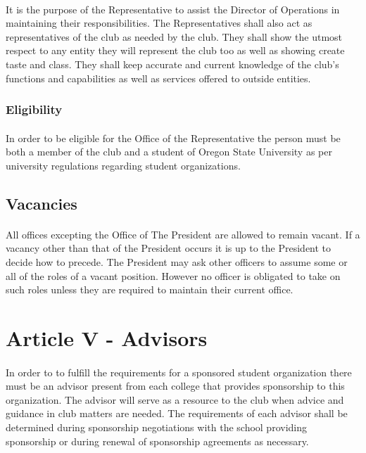 \documentclass[12pt]{article}
\newcommand{\article}[1]{
\setcounter{section}{0}
\setcounter{subsection}{0}

	\section*{#1}
	\addcontentsline{toc}{section}{#1}
	
}
\begin{document}
\paragraph{}
It is the purpose of the Representative to assist the Director of Operations in maintaining their responsibilities. The Representatives shall also act as representatives of the club as needed by the club. They shall show
the utmost respect to any entity they will represent the club too as well as showing create taste and class. They shall keep accurate and current knowledge of the club's functions and capabilities as well
as services offered to outside entities.
\subsubsection{Eligibility}
\paragraph{}
In order to be eligible for the Office of the Representative the person must be both a member of the club and a student of Oregon State University as per university regulations regarding student organizations.

\subsection{Vacancies}
\paragraph{}
All offices excepting the Office of The President are allowed to remain vacant. If a vacancy other 
than that of the President occurs it is up to the President to decide how to precede. The President
may ask other officers to assume some or all of the roles of a vacant position. However no officer
is obligated to take on such roles unless they are required to maintain their current office. 

\article{Article V - Advisors}
\paragraph{}
In order to to fulfill the requirements for a sponsored student organization there must be an advisor present from each college that provides sponsorship to this organization. 
The advisor will serve as a resource to the club when advice and guidance in club matters are needed. 
The requirements of each advisor shall be determined during sponsorship negotiations with the school
providing sponsorship or during renewal of sponsorship agreements as necessary.
\end{document}
